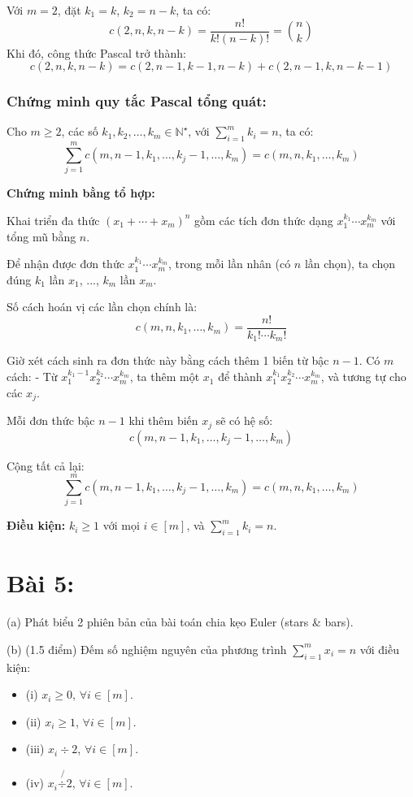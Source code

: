 \documentclass{article}
\begin{document}
	Với $m = 2$, đặt $k_1 = k$, $k_2 = n - k$, ta có:
	\[
	c(2,n,k,n - k) = \frac{n!}{k!(n - k)!} = \binom{n}{k}
	\]
	Khi đó, công thức Pascal trở thành:
	\[
	c(2,n,k,n-k) = c(2,n - 1,k - 1,n - k) + c(2,n - 1,k,n - k - 1)
	\]
	
	\subsubsection*{Chứng minh quy tắc Pascal tổng quát:}
	
	Cho $m \ge 2$, các số $k_1, k_2, \ldots, k_m \in \mathbb{N}^\star$, với $\sum_{i=1}^m k_i = n$, ta có:
	\[
	\sum_{j = 1}^m c\left(m, n - 1, k_1, \ldots, k_j - 1, \ldots, k_m\right) = c(m,n,k_1,\ldots,k_m)
	\]
	
	\textbf{Chứng minh bằng tổ hợp:}
	
	Khai triển đa thức $(x_1 + \cdots + x_m)^n$ gồm các tích đơn thức dạng $x_1^{k_1} \cdots x_m^{k_m}$ với tổng mũ bằng $n$.
	
	Để nhận được đơn thức $x_1^{k_1}\cdots x_m^{k_m}$, trong mỗi lần nhân (có $n$ lần chọn), ta chọn đúng $k_1$ lần $x_1$, ..., $k_m$ lần $x_m$.
	
	Số cách hoán vị các lần chọn chính là:
	\[
	c(m,n,k_1,\ldots,k_m) = \frac{n!}{k_1! \cdots k_m!}
	\]
	
	Giờ xét cách sinh ra đơn thức này bằng cách thêm 1 biến từ bậc $n - 1$. Có $m$ cách:
	- Từ $x_1^{k_1 - 1}x_2^{k_2} \cdots x_m^{k_m}$, ta thêm một $x_1$ để thành $x_1^{k_1}x_2^{k_2} \cdots x_m^{k_m}$, và tương tự cho các $x_j$.
	
	Mỗi đơn thức bậc $n - 1$ khi thêm biến $x_j$ sẽ có hệ số:
	\[
	c(m,n - 1, k_1,\ldots, k_j - 1, \ldots, k_m)
	\]
	
	Cộng tất cả lại:
	\[
	\boxed{
		\sum_{j=1}^{m} c\left(m, n - 1, k_1,\ldots, k_j - 1,\ldots, k_m\right) = c(m,n,k_1,\ldots,k_m)
	}
	\]
	
	\textbf{Điều kiện:} $k_i \ge 1$ với mọi $i \in [m]$, và $\sum_{i=1}^m k_i = n$.
	
	\section*{Bài 5:}
	(a) Phát biểu 2 phiên bản của bài toán chia kẹo Euler (stars \& bars). 
	
	(b) {\rm(1.5 điểm)} Đếm số nghiệm nguyên của phương trình $\sum_{i=1}^m x_i = n$ với điều kiện: 
	
	\begin{itemize}
		\item (i) $x_i\ge0$, $\forall i\in[m]$.
		\item (ii) $x_i\ge1$, $\forall i\in[m]$.
		\item (iii) $x_i\div2$, $\forall i\in[m]$.
		\item (iv) $x_i\not{\div2}$, $\forall i\in[m]$.
	\end{itemize}
	
\end{document}
